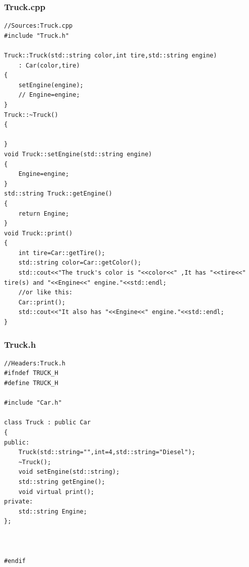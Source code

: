 \documentclass[UTF8,18pt]{ctexart}
\begin{document}
\subsubsection{Truck.cpp}
\begin{verbatim}
//Sources:Truck.cpp
#include "Truck.h"

Truck::Truck(std::string color,int tire,std::string engine)
    : Car(color,tire)
{
    setEngine(engine);
    // Engine=engine;
}
Truck::~Truck()
{

}
void Truck::setEngine(std::string engine)
{
    Engine=engine;
}
std::string Truck::getEngine()
{
    return Engine;
}
void Truck::print()
{
    int tire=Car::getTire();
    std::string color=Car::getColor();
    std::cout<<"The truck's color is "<<color<<" ,It has "<<tire<<" tire(s) and "<<Engine<<" engine."<<std::endl;
    //or like this:
    Car::print();
    std::cout<<"It also has "<<Engine<<" engine."<<std::endl;
}               
\end{verbatim}             
\subsubsection{Truck.h}
\begin{verbatim}
//Headers:Truck.h
#ifndef TRUCK_H
#define TRUCK_H

#include "Car.h"

class Truck : public Car
{
public:
	Truck(std::string="",int=4,std::string="Diesel");
	~Truck();
	void setEngine(std::string);
	std::string getEngine();
	void virtual print();
private:
	std::string Engine;
};



#endif
\end{verbatim}
\end{document}
